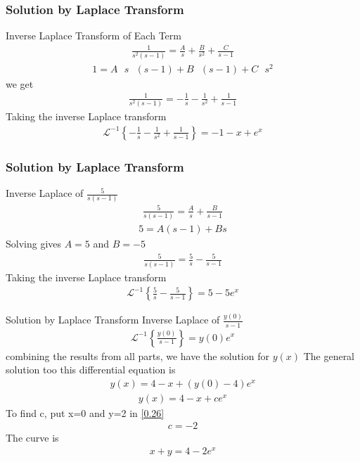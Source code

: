\documentclass{beamer}
\begin{document}
\begin{frame}
\frametitle{Solution by Laplace Transform}
Inverse Laplace Transform of Each Term
\begin{align}
    \frac{1}{s^2 (s - 1)} = \frac{A}{s} + \frac{B}{s^2} + \frac{C}{s - 1}
\end{align}
\begin{align}
    1 = A\text{ } s\text{ } (s - 1) + B \text{ }(s - 1) + C \text{ }s^2
\end{align}
we get
\begin{align}
    \frac{1}{s^2 (s - 1)} = -\frac{1}{s} -\frac{1}{s^2} + \frac{1}{s - 1}
\end{align}
Taking the inverse Laplace transform
\begin{align}
    \mathcal{L}^{-1}\left\{ -\frac{1}{s} -\frac{1}{s^2}+ \frac{1}{s - 1} \right\} = -1 - x + e^x
\end{align}
\end{frame}
\begin{frame}
\frametitle{Solution by Laplace Transform}
Inverse Laplace of \( \frac{5}{s (s - 1)} \)
\begin{align}
    \frac{5}{s (s - 1)} = \frac{A}{s} + \frac{B}{s - 1}
\end{align}
\begin{align}
    5 = A (s - 1) + B s
\end{align}
Solving gives \( A = 5 \) and \( B = -5 \)
\begin{align}
    \frac{5}{s (s - 1)} = \frac{5}{s} - \frac{5}{s - 1}
\end{align}
Taking the inverse Laplace transform
\begin{align}
    \mathcal{L}^{-1}\left\{ \frac{5}{s} - \frac{5}{s - 1} \right\} = 5 - 5 e^x
\end{align}

\end{frame}
\begin{frame}{Solution by Laplace Transform}
Inverse Laplace of \( \frac{y(0)}{s - 1} \)
\begin{align}
    \mathcal{L}^{-1}\left\{ \frac{y(0)}{s - 1} \right\} = y(0) e^x
\end{align}
combining the results from all parts, we have the solution for $y(x)$
The general solution too this differential equation is 
\begin{align}
    y(x) = 4 - x + (y(0) - 4) e^x 
\end{align}
\begin{align}
     y(x) = 4 - x + c  e^x
    \label{0.26}
\end{align}
To find c, put x=0 and y=2 in \ref{0.26}
\begin{align}
    c = -2  
\end{align}
The curve is 
\begin{align}
   x+y = 4 -2e^x
\end{align}
\end{frame}
\end{document}
